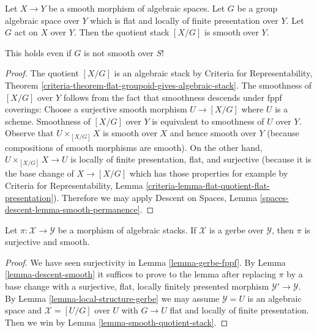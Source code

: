 \begin{lemma}
\label{lemma-smooth-quotient-stack}
Let $X \to Y$ be a smooth morphism of algebraic spaces.
Let $G$ be a group algebraic space over $Y$ which is flat
and locally of finite presentation over $Y$. Let $G$ act on $X$ over $Y$.
Then the quotient stack $[X/G]$ is smooth over $Y$.
\end{lemma}

\noindent
This holds even if $G$ is not smooth over $S$!

\begin{proof}
The quotient $[X/G]$ is an algebraic stack by
Criteria for Representability, Theorem
\ref{criteria-theorem-flat-groupoid-gives-algebraic-stack}.
The smoothness of $[X/G]$ over $Y$ follows from the fact that smoothness
descends under fppf coverings:
Choose a surjective smooth morphism $U \to [X/G]$ where $U$ is a scheme.
Smoothness of $[X/G]$ over $Y$ is equivalent to smoothness of $U$ over $Y$.
Observe that $U \times_{[X/G]} X$ is smooth over $X$ and hence smooth
over $Y$ (because compositions of smooth morphisms are smooth).
On the other hand, $U \times_{[X/G]} X \to U$ is locally of
finite presentation, flat, and surjective (because it is
the base change of $X \to [X/G]$ which has those properties
for example by Criteria for Representability, Lemma
\ref{criteria-lemma-flat-quotient-flat-presentation}).
Therefore we may apply Descent on Spaces,
Lemma \ref{spaces-descent-lemma-smooth-permanence}.
\end{proof}

\begin{lemma}
\label{lemma-gerbe-smooth}
Let $\pi : \mathcal{X} \to \mathcal{Y}$ be a morphism of algebraic stacks.
If $\mathcal{X}$ is a gerbe over $\mathcal{Y}$, then $\pi$ is surjective
and smooth.
\end{lemma}

\begin{proof}
We have seen surjectivity in Lemma \ref{lemma-gerbe-fppf}.
By Lemma \ref{lemma-descent-smooth}
it suffices to prove to the lemma after replacing $\pi$ by a base change
with a surjective, flat, locally finitely presented morphism
$\mathcal{Y}' \to \mathcal{Y}$. By
Lemma \ref{lemma-local-structure-gerbe}
we may assume $\mathcal{Y} = U$ is an algebraic space and
$\mathcal{X} = [U/G]$ over $U$ with $G \to U$ flat and
locally of finite presentation.
Then we win by Lemma \ref{lemma-smooth-quotient-stack}.
\end{proof}





